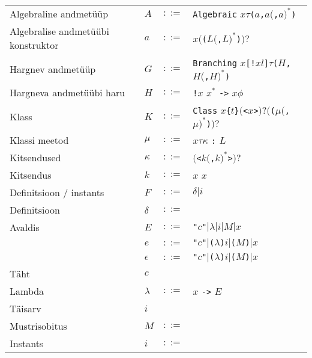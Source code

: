 \documentclass[12pt]{article}
\begin{document}
\begin{tabular}{llll}
      Algebraline andmetüüp & $A$ & $::=$ & {\color{helehall}\verb!Algebraic!} $x\tau${\color{helehall}\verb!(!}$a${\color{helehall}\verb!,!}$a(${\color{helehall}\verb!,!}$a)^*${\color{helehall}\verb!)!} \\
      Algebralise andmetüübi konstruktor & $a$ & $::=$ & $x(${\color{helehall}\verb!(!}$L(${\color{helehall}\verb!,!}$L)^*${\color{helehall}\verb!)!}$)?$ \\
      Hargnev andmetüüp & $G$ & $::=$ & {\color{helehall}\verb!Branching!} $x${\color{helehall}\verb"[!"}$xl${\color{helehall}\verb!]!}$\tau${\color{helehall}\verb!(!}$H${\color{helehall}\verb!,!}$H(${\color{helehall}\verb!,!}$H)^*${\color{helehall}\verb!)!} \\
      Hargneva andmetüübi haru & $H$ & $::=$ & {\color{helehall}\verb"!"}$x$ $x^*$ {\color{helehall}\verb!->!} $x\phi$ \\
      Klass & $K$ & $::=$ & {\color{helehall}\verb!Class!} $x${\color{helehall}\verb!{!}$t${\color{helehall}\verb!}!}$(${\color{helehall}\verb!<!}$x${\color{helehall}\verb!>!}$)?(${\color{helehall}\verb!(!}$\mu(${\color{helehall}\verb!,!}$\mu)^*${\color{helehall}\verb!)!}$)?$ \\
      Klassi meetod & $\mu$ & $::=$ & $x\tau\kappa$ {\color{helehall}\verb!:!} $L$ \\
      Kitsendused & $\kappa$ & $::=$ & $(${\color{helehall}\verb!<!}$k(${\color{helehall}\verb!,!}$k)^*${\color{helehall}\verb!>!}$)?$ \\
      Kitsendus & $k$ & $::=$ & $x$ $x$ \\
      Definitsioon / instants & $F$ & $::=$ & $\delta|i$ \\
      Definitsioon & $\delta$ & $::=$ &  \\
      Avaldis & $E$ & $::=$ & {\color{helehall}\verb!"!}$c${\color{helehall}\verb!"!}$|\lambda|i|M|x$ \\
         & $e$ & $::=$ & {\color{helehall}\verb!"!}$c${\color{helehall}\verb!"!}$|${\color{helehall}\verb!(!}$\lambda${\color{helehall}\verb!)!}$i|${\color{helehall}\verb!(!}$M${\color{helehall}\verb!)!}$|x$ \\
         & $\epsilon$ & $::=$ & {\color{helehall}\verb!"!}$c${\color{helehall}\verb!"!}$|${\color{helehall}\verb!(!}$\lambda${\color{helehall}\verb!)!}$i|${\color{helehall}\verb!(!}$M${\color{helehall}\verb!)!}$|x$ \\
      Täht & $c$ & &  \\
      Lambda & $\lambda$ & $::=$ & $x$ {\color{helehall}\verb!->!} $E$ \\
      Täisarv & $i$ &  &  \\
      Mustrisobitus & $M$ & $::=$ &  \\
      Instants & $i$ & $::=$ &  \\
    \end{tabular}
\end{document}
